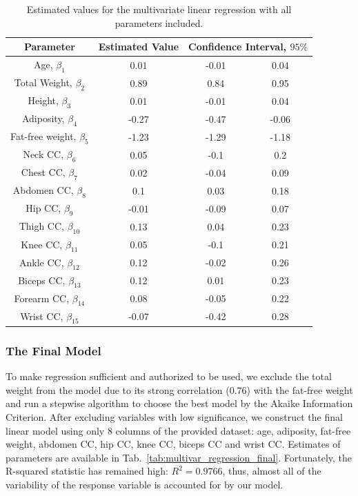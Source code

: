 \documentclass[11pt,american,american]{article}
\begin{document}
\begin{table}[H]
	\centering
	\begin{tabular}{|c||c||c|c|}
		\hline 
		Parameter &  Estimated Value & \multicolumn{2}{c|}{Confidence Interval, $95\%$}  \\ 
		\hline \hline 
		Age, $\beta_{1}$ & 0.01 & -0.01 &  0.04 \\ 
		\hline 
		Total Weight, $\beta_{2}$ & 0.89 & 0.84 &  0.95 \\ 
		\hline 
		Height, $\beta_{3}$ & 0.01 & -0.01 & 0.04 \\ 
		\hline
		Adiposity, $\beta_{4}$ & -0.27 & -0.47 & -0.06  \\
		\hline 
		Fat-free weight, $\beta_{5}$ & -1.23 & -1.29 & -1.18  \\
		\hline
		Neck CC, $\beta_{6}$ & 0.05 & -0.1 & 0.2  \\
		\hline
		Chest CC, $\beta_{7}$ & 0.02 & -0.04 & 0.09  \\
		\hline
		Abdomen CC, $\beta_{8}$ & 0.1 & 0.03 & 0.18  \\
		\hline
		Hip CC, $\beta_{9}$ & -0.01 & -0.09 & 0.07  \\
		\hline
		Thigh CC, $\beta_{10}$ & 0.13 & 0.04 & 0.23  \\
		\hline
		Knee CC, $\beta_{11}$ & 0.05 & -0.1 & 0.21  \\
		\hline
		Ankle CC, $\beta_{12}$ & 0.12 & -0.02 & 0.26  \\
		\hline
		Biceps CC, $\beta_{13}$ & 0.12 & 0.01 & 0.23  \\
		\hline
		Forearm CC, $\beta_{14}$ & 0.08 & -0.05 & 0.22  \\
		\hline
		Wrist CC, $\beta_{15}$ & -0.07 & -0.42 & 0.28  \\
		\hline
	\end{tabular} 
	\caption{Estimated values for the multivariate linear regression with all parameters included.}
	\label{tab:multivar_regression}
\end{table}



\subsubsection{The Final Model}

To make regression sufficient and authorized to be used, we exclude the total weight from the model due to its strong correlation ($0.76$) with the fat-free weight and run a stepwise algorithm to choose the best model by the Akaike Information Criterion. After excluding variables with low significance, we construct the final linear model using only  $8$ columns of the provided dataset: age, adiposity, fat-free weight, abdomen CC, hip CC, knee CC, biceps CC and wrist CC. Estimates of parameters are available in Tab.~\ref{tab:multivar_regression_final}. Fortunately, the R-squared statistic has remained high: $R^{2} = 0.9766$, thus, almost all of the variability of the response variable is accounted for by our model.
\end{document}
